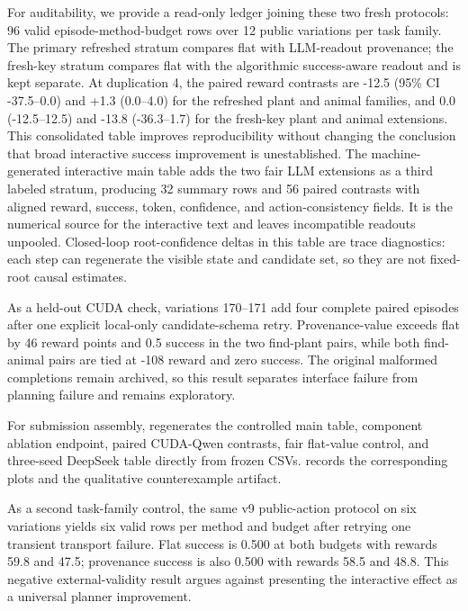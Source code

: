 \documentclass[10pt]{article}
\begin{document}
For auditability, we provide a read-only ledger joining these two fresh protocols: 96 valid episode-method-budget rows over 12 public variations per task family. The primary refreshed stratum compares flat with LLM-readout provenance; the fresh-key stratum compares flat with the algorithmic success-aware readout and is kept separate. At duplication 4, the paired reward contrasts are -12.5 (95\% CI -37.5--0.0) and +1.3 (0.0--4.0) for the refreshed plant and animal families, and 0.0 (-12.5--12.5) and -13.8 (-36.3--1.7) for the fresh-key plant and animal extensions. This consolidated table improves reproducibility without changing the conclusion that broad interactive success improvement is unestablished. The machine-generated interactive main table adds the two fair LLM extensions as a third labeled stratum, producing 32 summary rows and 56 paired contrasts with aligned reward, success, token, confidence, and action-consistency fields. It is the numerical source for the interactive text and leaves incompatible readouts unpooled. Closed-loop root-confidence deltas in this table are trace diagnostics: each step can regenerate the visible state and candidate set, so they are not fixed-root causal estimates.

As a held-out CUDA check, variations 170--171 add four complete paired episodes after one explicit local-only candidate-schema retry. Provenance-value exceeds flat by 46 reward points and 0.5 success in the two find-plant pairs, while both find-animal pairs are tied at -108 reward and zero success. The original malformed completions remain archived, so this result separates interface failure from planning failure and remains exploratory.

For submission assembly, \texttt{} regenerates the controlled main table, component ablation endpoint, paired CUDA-Qwen contrasts, fair flat-value control, and three-seed DeepSeek table directly from frozen CSVs. \texttt{} records the corresponding plots and the qualitative counterexample artifact.

As a second task-family control, the same v9 public-action protocol on six \texttt{} variations yields six valid rows per method and budget after retrying one transient transport failure. Flat success is 0.500 at both budgets with rewards 59.8 and 47.5; provenance success is also 0.500 with rewards 58.5 and 48.8. This negative external-validity result argues against presenting the interactive effect as a universal planner improvement.
\end{document}
